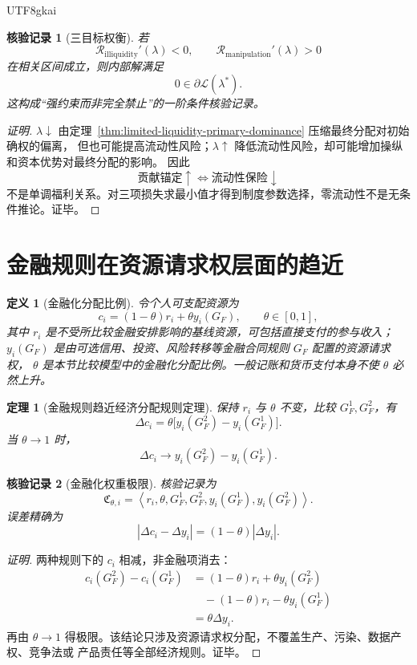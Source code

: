 \documentclass[12pt,a4paper,openany]{report}
\newtheorem{definition}{定义}[chapter]
\newtheorem{theorem}{定理}[chapter]
\newtheorem{Certificate}{核验记录}[chapter]
\newcommand{\Abs}[1]{\left\lvert #1\right\rvert}
\newcommand{\Tuple}[1]{\left\langle #1\right\rangle}
\begin{document}
\begin{CJK*}{UTF8}{gkai}
\begin{Certificate}[三目标权衡]
若
\[
  \mathcal R_{\mathrm{illiquidity}}'(\lambda)<0,\qquad
  \mathcal R_{\mathrm{manipulation}}'(\lambda)>0
\]
在相关区间成立，则内部解满足
\[
  0\in\partial\mathcal L(\lambda^*).
\]
这构成“强约束而非完全禁止”的一阶条件核验记录。
\end{Certificate}

\begin{proof}[证明]
\(\lambda\downarrow\) 由定理~\ref{thm:limited-liquidity-primary-dominance} 压缩最终分配对初始确权的偏离，
但也可能提高流动性风险；\(\lambda\uparrow\) 降低流动性风险，却可能增加操纵和资本优势对最终分配的影响。
因此
\[
  \text{贡献锚定}\uparrow
  \Longleftrightarrow
  \text{流动性保险}\downarrow
\]
不是单调福利关系。对三项损失求最小值才得到制度参数选择，零流动性不是无条件推论。证毕。
\end{proof}

\section{金融规则在资源请求权层面的趋近}

\begin{definition}[金融化分配比例]
令个人可支配资源为
\[
  c_i=(1-\theta)r_i+\theta y_i(G_F),
\qquad \theta\in[0,1],
\]
其中 \(r_i\) 是不受所比较金融安排影响的基线资源，可包括直接支付的参与收入；
\(y_i(G_F)\) 是由可选信用、投资、风险转移等金融合同规则 \(G_F\) 配置的资源请求权，
\(\theta\) 是本节比较模型中的金融化分配比例。一般记账和货币支付本身不使 \(\theta\) 必然上升。
\end{definition}

\begin{theorem}[金融规则趋近经济分配规则定理]
\label{thm:financial-rule-convergence}
保持 \(r_i\) 与 \(\theta\) 不变，比较 \(G_F^1,G_F^2\)，有
\[
  \Delta c_i
  =
  \theta\bigl[y_i(G_F^2)-y_i(G_F^1)\bigr].
\]
当 \(\theta\to1\) 时，
\[
  \Delta c_i\to
  y_i(G_F^2)-y_i(G_F^1).
\]
\end{theorem}

\begin{Certificate}[金融化权重极限]
核验记录为
\[
  \mathfrak C_{\theta,i}
  =
  \Tuple{r_i,\theta,G_F^1,G_F^2,y_i(G_F^1),y_i(G_F^2)}.
\]
误差精确为
\[
  \Abs{\Delta c_i-\Delta y_i}
  =(1-\theta)\Abs{\Delta y_i}.
\]
\end{Certificate}

\begin{proof}[证明]
两种规则下的 \(c_i\) 相减，非金融项消去：
\[
\begin{aligned}
  c_i(G_F^2)-c_i(G_F^1)
  &=
  (1-\theta)r_i+\theta y_i(G_F^2)\\
  &\quad-(1-\theta)r_i-\theta y_i(G_F^1)\\
  &=\theta\Delta y_i.
\end{aligned}
\]
再由 \(\theta\to1\) 得极限。该结论只涉及资源请求权分配，不覆盖生产、污染、数据产权、竞争法或
产品责任等全部经济规则。证毕。
\end{proof}


\end{CJK*}
\end{document}

